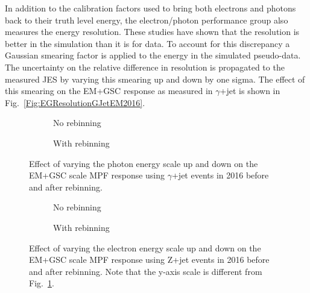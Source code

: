 In addition to the calibration factors used to bring both electrons and photons back to their truth level energy, the electron/photon performance group also measures the energy resolution.  
These studies have shown that the resolution is better in the simulation than it is for data.  
To account for this discrepancy a Gaussian smearing factor is applied to the energy in the simulated pseudo-data.  
The uncertainty on the relative difference in resolution is propagated to the measured JES by varying this smearing up and down by one sigma.  
The effect of this smearing on the EM+GSC response as measured in $\gamma$+jet is shown in Fig.~\ref{Fig:EGResolutionGJetEM2016}.  

\begin{figure}[!ht]
  \centering
  \begin{subfigure}{.5\textwidth}
    \centering
    \caption{No rebinning}
  \end{subfigure}%
  \begin{subfigure}{.5\textwidth}  \centering
    \caption{With rebinning}
  \end{subfigure}
  \caption{Effect of varying the photon energy scale up and down on the EM+GSC scale MPF response using $\gamma$+jet events in 2016 before and after rebinning. }
  \label{Fig:EGScaleGJetEM2016}
\end{figure}

\begin{figure}[!ht]
  \centering
  \begin{subfigure}{.5\textwidth}
    \centering
    \caption{No rebinning}
  \end{subfigure}%
  \begin{subfigure}{.5\textwidth}  \centering
    \caption{With rebinning}
  \end{subfigure}
  \caption{Effect of varying the electron energy scale up and down on the EM+GSC scale MPF response using Z+jet events in 2016 before and after rebinning.  Note that the y-axis scale is different from Fig.~\ref{Fig:EGScaleGJetEM2016}. } 
  \label{Fig:EGScaleZJetEM2016}
\end{figure}


